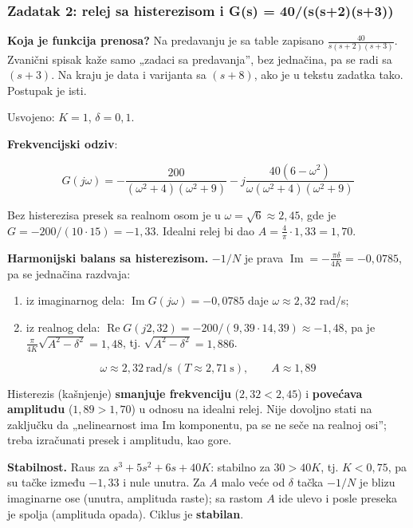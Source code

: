 \documentclass[11pt,a4paper,parskip=half,headsepline,numbers=noenddot]{scrartcl}
\begin{document}
\subsubsection{Zadatak 2: relej sa histerezisom i G(s) = 40/(s(s+2)(s+3))}

\textbf{Koja je funkcija prenosa?} Na predavanju je sa table zapisano \(\frac{40}{s(s+2)(s+3)}\). Zvanični spisak kaže samo „zadaci sa predavanja'', bez jednačina, pa se radi sa \((s+3)\). Na kraju je data i varijanta sa \((s+8)\), ako je u tekstu zadatka tako. Postupak je isti.

Usvojeno: \(K = 1\), \(\delta = 0{,}1\).

\textbf{Frekvencijski odziv}:

\[G(j\omega) = -\frac{200}{(\omega^2 + 4)(\omega^2 + 9)} - j\frac{40(6 - \omega^2)}{\omega(\omega^2 + 4)(\omega^2 + 9)}\]

Bez histerezisa presek sa realnom osom je u \(\omega = \sqrt6 \approx 2{,}45\), gde je \(G = -200/(10\cdot15) = -1{,}33\). Idealni relej bi dao \(A = \frac{4}{\pi}\cdot1{,}33 = 1{,}70\).

\textbf{Harmonijski balans sa histerezisom.} \(-1/N\) je prava \(\operatorname{Im} = -\frac{\pi\delta}{4K} = -0{,}0785\), pa se jednačina razdvaja:

\begin{enumerate}
\def\labelenumi{\arabic{enumi}.}
\item iz imaginarnog dela: \(\operatorname{Im}G(j\omega) = -0{,}0785\) daje \(\omega \approx 2{,}32\) rad/s;
\item iz realnog dela: \(\operatorname{Re}G(j2{,}32) = -200/(9{,}39\cdot14{,}39) \approx -1{,}48\), pa je \(\frac{\pi}{4K}\sqrt{A^2 - \delta^2} = 1{,}48\), tj. \(\sqrt{A^2 - \delta^2} = 1{,}886\).
\end{enumerate}

\[\omega \approx 2{,}32\ \text{rad/s}\ (T \approx 2{,}71\ \text{s}), \qquad A \approx 1{,}89\]

Histerezis (kašnjenje) \textbf{smanjuje frekvenciju} (\(2{,}32 < 2{,}45\)) i \textbf{povećava amplitudu} (\(1{,}89 > 1{,}70\)) u odnosu na idealni relej. Nije dovoljno stati na zaključku da „nelinearnost ima Im komponentu, pa se ne seče na realnoj osi''; treba izračunati presek i amplitudu, kao gore.

\textbf{Stabilnost.} Raus za \(s^3 + 5s^2 + 6s + 40K\): stabilno za \(30 > 40K\), tj. \(K < 0{,}75\), pa su tačke između \(-1{,}33\) i nule unutra. Za \(A\) malo veće od \(\delta\) tačka \(-1/N\) je blizu imaginarne ose (unutra, amplituda raste); sa rastom \(A\) ide ulevo i posle preseka je spolja (amplituda opada). Ciklus je \textbf{stabilan}.
\end{document}
